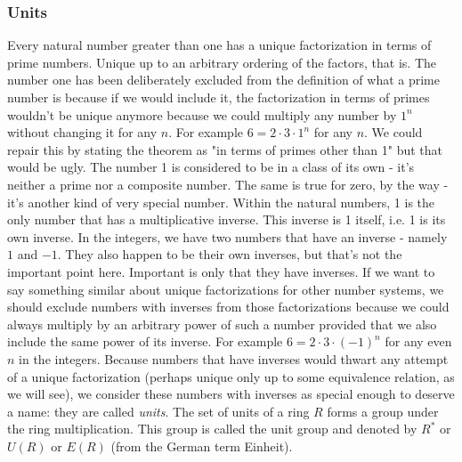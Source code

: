 

\subsubsection{Units}
Every natural number greater than one has a unique factorization in terms of prime numbers. Unique up to an arbitrary ordering of the factors, that is. The number one has been deliberately excluded from the definition of what a prime number is because if we would include it, the factorization in terms of primes wouldn't be unique anymore because we could multiply any number by $1^n$ without changing it for any $n$. For example $6 = 2 \cdot 3 \cdot 1^n$ for any $n$. We could repair this by stating the theorem as "in terms of primes other than 1" but that would be ugly. The number 1 is considered to be in a class of its own - it's neither a prime nor a composite number. The same is true for zero, by the way - it's another kind of very special number. Within the natural numbers, 1 is the only number that has a multiplicative inverse. This inverse is 1 itself, i.e. 1 is its own inverse. In the integers, we have two numbers that have an inverse - namely $1$ and $-1$. They also happen to be their own inverses, but that's not the important point here. Important is only that they have inverses. If we want to say something similar about unique factorizations for other number systems, we should exclude numbers with inverses from those factorizations because we could always multiply by an arbitrary power of such a number provided that we also include the same power of its inverse. For example $6 = 2 \cdot 3 \cdot (-1)^n$ for any even $n$ in the integers. Because numbers that have inverses would thwart any attempt of a unique factorization (perhaps unique only up to some equivalence relation, as we will see), we consider these numbers with inverses as special enough to deserve a name: they are called \emph{units}. The set of units of a ring $R$ forms a group under the ring multiplication. This group is called the unit group and denoted by $R^*$ or $U(R)$ or $E(R)$ (from the German term Einheit).

